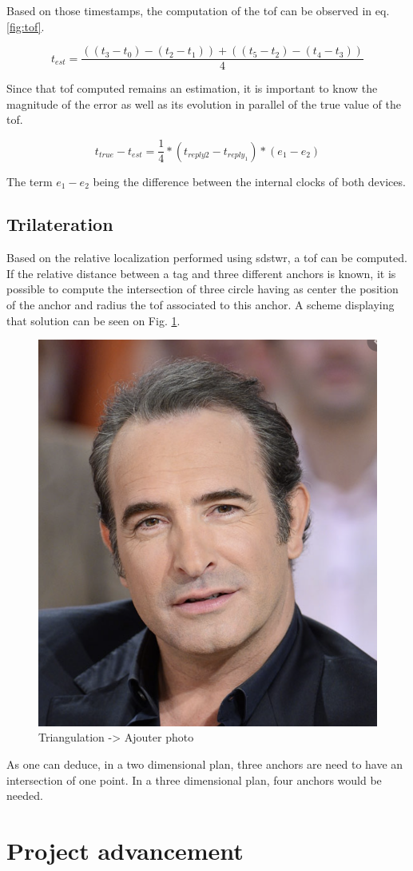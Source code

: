 Based on those timestamps, the computation of the \gls{tof} can be observed in eq. \ref{fig:tof}.

\begin{equation}
	t_{est} = \frac{((t_3 - t_0) - (t_2 - t_1)) + ((t_5 - t_2) - (t_4 - t_3))}{4}
\label{fig:tof}
\end{equation}

Since that \gls{tof} computed remains an estimation, it is important to know the magnitude of the error as well as its evolution in parallel of the true value of the \gls{tof}.

\begin{equation}
	t_{true} - t_{est} = \frac{1}{4}*(t_{reply2} - t_{reply_1})*(e_1 - e_2)
\end{equation}

The term $e_1 - e_2$ being the difference between the internal clocks of both devices. \cite{dalce2011comparison}

\subsection{Trilateration}

Based on the relative localization performed using \gls{sdstwr}, a \gls{tof} can be computed. If the relative distance between a tag and three different anchors is known, it is possible to compute the intersection of three circle having as center the position of the anchor and radius the \gls{tof} associated to this anchor. A scheme displaying that solution can be seen on Fig. \ref{fig:triangulation}.

\begin{figure}[H]
\centering
\includegraphics[width=.2\linewidth]{Images/Temporary_pic.png}
\caption{Triangulation -> Ajouter photo}
\label{fig:triangulation}
\end{figure}

As one can deduce, in a two dimensional  plan, three anchors are need to have an intersection of one point. In a three dimensional plan, four anchors would be needed.

\section{Project advancement}

